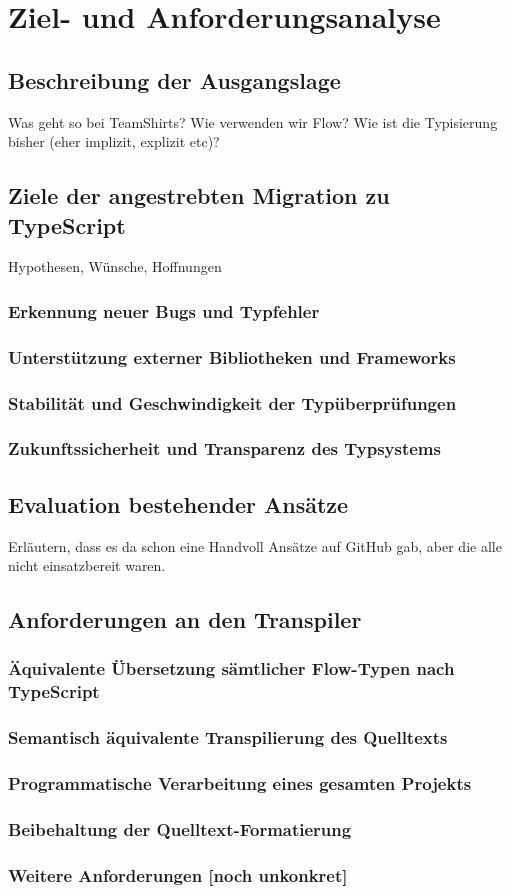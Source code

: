 \chapter{Ziel- und Anforderungsanalyse}

\section{Beschreibung der Ausgangslage}

Was geht so bei TeamShirts? Wie verwenden wir Flow? Wie ist die Typisierung bisher (eher implizit, explizit etc)?

\section{Ziele der angestrebten Migration zu TypeScript}

Hypothesen, Wünsche, Hoffnungen

  \subsection{Erkennung neuer Bugs und Typfehler}
  \subsection{Unterstützung externer Bibliotheken und Frameworks}
  \subsection{Stabilität und Geschwindigkeit der Typüberprüfungen}
  \subsection{Zukunftssicherheit und Transparenz des Typsystems}

\section{Evaluation bestehender Ansätze}

Erläutern, dass es da schon eine Handvoll Ansätze auf GitHub gab, aber die alle nicht einsatzbereit waren.

\section{Anforderungen an den Transpiler}

  \subsection{Äquivalente Übersetzung sämtlicher Flow-Typen nach TypeScript}
  \subsection{Semantisch äquivalente Transpilierung des Quelltexts}
  \subsection{Programmatische Verarbeitung eines gesamten Projekts}
  \subsection{Beibehaltung der Quelltext-Formatierung}
  \subsection{Weitere Anforderungen [noch unkonkret]}
